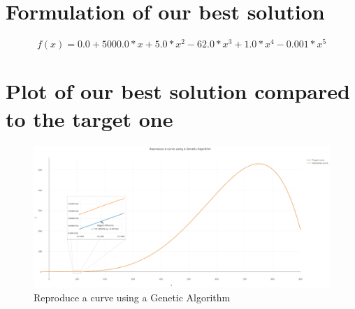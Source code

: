 \documentclass[12pt]{article}
\begin{document}
\section{Formulation of our best solution}

$$f(x) = 0.0 + 5000.0*x + 5.0*x^2 - 62.0*x^3 + 1.0*x^4 - 0.001*x^5$$

\section{Plot of our best solution compared to the target one}

\begin{figure}[H]
	\centering
	\includegraphics[width=1.0\columnwidth, angle=270]{./plot_solution.png}
	\caption{Reproduce a curve using a Genetic Algorithm}
\end{figure}
\end{document}
